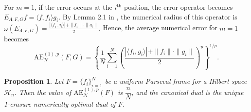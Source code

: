 \documentclass[final,1p,times]{elsarticle}
\newtheorem{prop}[thm]{Proposition}
\begin{document}
\noindent For \( m = 1 \), if the error occurs at the \( i^{\text{th}} \) position, the error operator becomes $E_{\Lambda, F, G} f = \langle f, f_i \rangle g_i.$ By Lemma 2.1 in \cite{chien}, the numerical radius of this operator is $\omega\left( E_{\Lambda, F, G} \right) = \frac{\left| \langle f_i, g_i \rangle \right| + \|f_i\| \cdot \|g_i\|}{2}.$
Hence, the average numerical error for \( m = 1 \) becomes
\begin{equation}\label{eqn5point14}
   \mathrm{AE}_{\mathcal{N}}^{(1),p}(F, G) = \left\{ \frac{1}{N} \sum_{i=1}^N \left( \frac{|\langle f_i, g_i \rangle| + \|f_i\| \cdot \|g_i\|}{2} \right)^p \right\}^{1/p}. 
\end{equation}


 
   \begin{prop}
    Let \( F = \{f_i\}_{i=1}^N \) be a uniform Parseval frame for a Hilbert space \( \mathcal{H}_n \). Then the value of \( \mathrm{AE}_{\mathcal{N}}^{(1),p}(F) \) is \( \dfrac{n}{N} \), and the canonical dual is the unique 1-erasure numerically optimal dual of \( F \).
\end{prop}
\end{document}
